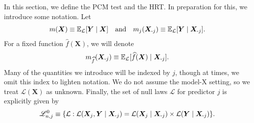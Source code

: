 \documentclass[12pt]{article}
\theoremstyle{definition}
\theoremstyle{remark}
\newcommand{\E}{\mathbb E}								%
\newcommand{\R}{\mathbb{R}}								%
\newcommand{\independent}{{\ \perp \! \! \! \perp\ }}	%
\newcommand{\iidsim}{\stackrel{\mathrm{i.i.d.}}{\sim}} 	%
\newcommand{\prx}{\bm X}								%
\newcommand{\srx}{X}									%
\newcommand{\prz}{\bm Z}								%
\newcommand{\srz}{Z}									%
\newcommand{\pry}{{\bm Y}}								%
\newcommand{\sry}{Y}									%
\newcommand{\law}{\mathcal L}							%
\newcommand{\nulllaws}{\mathscr L^0}					%
\newcommand{\minus}{\textnormal{-}} 						    %
\begin{document}

In this section, we define the PCM test and the HRT. In preparation for this, we introduce some notation. Let
\begin{equation}
m(\prx) \equiv \E_\law [\pry \mid \prx] \quad \textnormal{and} \quad m_j(\prx_{\minus j}) \equiv \E_\law [\pry \mid \prx_{\minus j}].
\end{equation}
For a fixed function $\widehat f(\prx)$, we will denote
\begin{equation}
m_{\widehat f}(\prx_{\minus j}) \equiv \E_\law [\widehat f(\prx) \mid \prx_{\minus j}].
\end{equation}
Many of the quantities we introduce will be indexed by $j$, though at times, we omit this index to lighten notation. We do not assume the model-X setting, so we treat $\law(\prx)$ as unknown. Finally, the set of null laws $\law$ for predictor $j$ is explicitly given by
\begin{equation}
	\nulllaws_{n,j} \equiv \{\law: \law(\prx_j, \pry \mid \prx_{\minus j}) = \law(\prx_{j}\mid\prx_{\minus j}) \times \law(\pry\mid\prx_{\minus j})\}.
\end{equation}
\end{document}
